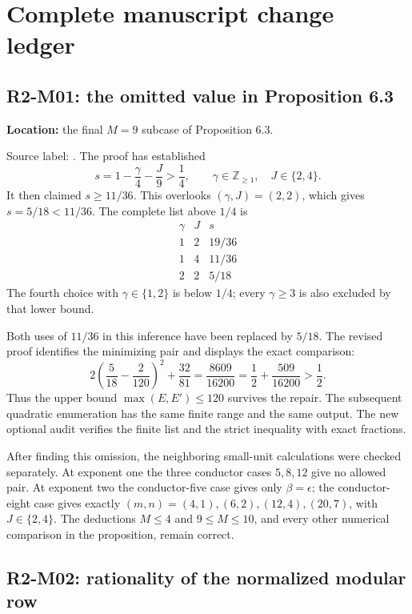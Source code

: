 \documentclass[11pt,a4paper]{article}
\begin{document}
\section{Complete manuscript change ledger}

\subsection{R2-M01: the omitted value in Proposition 6.3}

\textbf{Location:} the final $M=9$ subcase of Proposition 6.3.
\par\noindent Source label: .
The proof has established
\[
 s=1-\frac{\gamma}{4}-\frac J9>\frac14,
 \qquad \gamma\in\mathbb Z_{\ge1},\quad J\in\{2,4\}.
\]
It then claimed $s\ge11/36$. This overlooks $(\gamma,J)=(2,2)$,
which gives $s=5/18<11/36$. The complete list above $1/4$ is
\[
\begin{array}{c|c|c}
\gamma&J&s\\\hline
1&2&19/36\\
1&4&11/36\\
2&2&5/18
\end{array}
\]
The fourth choice with $\gamma\in\{1,2\}$ is below $1/4$;
every $\gamma\ge3$ is also excluded by that lower bound.

Both uses of $11/36$ in this inference have been replaced by $5/18$.
The revised proof identifies the minimizing pair and displays the exact
comparison:
\[
 2\left(\frac5{18}-\frac2{120}\right)^2+\frac{32}{81}
 =\frac{8609}{16200}
 =\frac12+\frac{509}{16200}>\frac12.
\]
Thus the upper bound $\max(E,E')\le120$ survives the repair. The
subsequent quadratic enumeration has the same finite range and the same
output. The new optional audit verifies the finite list and the strict
inequality with exact fractions.

After finding this omission, the neighboring small-unit calculations
were checked separately. At exponent one the three conductor cases
$5,8,12$ give no allowed pair. At exponent two the conductor-five case
gives only $\beta=\epsilon$; the conductor-eight case gives exactly
$(m,n)=(4,1),(6,2),(12,4),(20,7)$, with $J\in\{2,4\}$.
The deductions $M\le4$ and $9\le M\le10$, and every other numerical
comparison in the proposition, remain correct.

\subsection{R2-M02: rationality of the normalized modular row}
\end{document}
